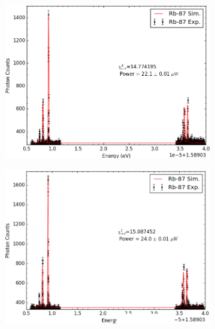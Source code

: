\begin{figure}[t!]
	\centering
    \begin{subfigure}[b]{0.49\textwidth}
        \includegraphics[width=\textwidth]{Graphics/107_108.png}
        \caption{}
    \end{subfigure}
    \begin{subfigure}[b]{0.49\textwidth}
        \includegraphics[width=\textwidth]{Graphics/094_095.png}
        \caption{}
        \label{}
    \end{subfigure}


\end{figure}
